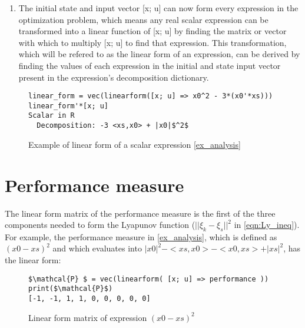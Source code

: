 \begin{enumerate}
\begin{figure}[h!]
\begin{lstlisting}[mathescape]
u  = collect(setdiff(variables(x$^+$), variables(x)))
5-element Vector{Expression}:
    <xs,$\nabla $f(x0)>
    <x0,$\nabla $f(x0)>
    <$\nabla $f(x0),xs>
    <$\nabla $f(x0),x0>
    |$\nabla $f(x0)|$^2$
        \end{lstlisting}    
    \caption{Updated state and input real scalar expressions from example \ref{ex_analysis}}
    \label{ex_updatedstate_input}
    \end{figure}
    \item The initial state and input vector [x; u] can now form every expression in the optimization problem, which means any real scalar expression can be transformed into a linear function of [x; u] by finding the matrix or vector with which to multiply [x; u] to find that expression. This transformation, which will be refered to as the linear form of an expression, can be derived by finding the values of each expression in the initial and state input vector present in the expression's decomposition dictionary.
\end{enumerate}

\begin{figure}[h!]
    \begin{lstlisting}[mathescape] 
linear_form = vec(linearform([x; u] => x0^2 - 3*(x0'*xs)))
linear_form'*[x; u]
Scalar in R
  Decomposition: -3 <xs,x0> + |x0|$^2$
\end{lstlisting}    
\caption{Example of linear form of a scalar expression \ref{ex_analysis}}
\label{ex_linearform}
\end{figure}

\section{Performance measure}
The linear form matrix of the performance measure is the first of the three components needed to form the Lyapunov function ($||\xi _k - \xi _s||^2$ in \ref{eqn:Ly_ineq}). For example, the performance measure in \ref{ex_analysis}, which is defined as $(x0-xs)^2$ and which evaluates into $|x0|^2 - <xs, x0> - <x0, xs> + |xs|^2$, has the linear form:
\begin{figure}[h!]
\begin{lstlisting}[mathescape]
$\mathcal{P} $ = vec(linearform( [x; u] => performance ))
print($\mathcal{P}$)
[-1, -1, 1, 1, 0, 0, 0, 0, 0]
\end{lstlisting}
\caption{Linear form matrix of expression $(x0-xs)^2$}
\label{ex_linearform2}
\end{figure}

